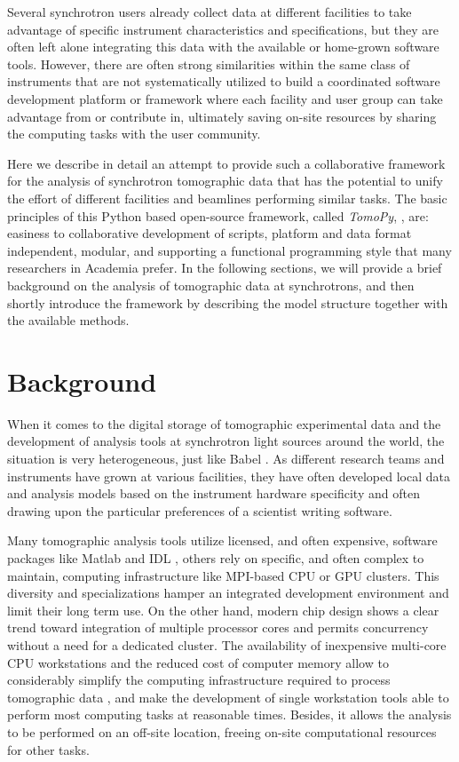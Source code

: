 \documentclass[pdf]{iucr}              %
\begin{document}
Several synchrotron users already collect data at different facilities to take advantage of specific instrument characteristics and specifications, but they are often left alone integrating this data with the available or home-grown software tools. However, there are often strong similarities within the same class of instruments that are not systematically utilized to build a coordinated software development platform or framework where each facility and user group can take advantage from or contribute in, ultimately saving on-site resources by sharing the computing tasks with the user community. 

Here we describe in detail an attempt to provide such a collaborative framework for the analysis of synchrotron tomographic data that has the potential to unify the effort of different facilities and beamlines performing similar tasks. The basic principles of this Python based open-source framework, called {\it TomoPy}, \cite{python_cpp}, are: easiness to collaborative development of scripts, platform and data format independent, modular,  and supporting a functional programming style that many researchers in Academia prefer. In the following sections, we will provide a brief background on the analysis of tomographic data at synchrotrons, and then shortly introduce the framework by describing the model structure together with the available methods. 


\section{Background}

When it comes to the digital storage of tomographic experimental data and the development of analysis tools at synchrotron light sources around the world, the situation is very heterogeneous, just like Babel \cite{genesis}. As different research teams and instruments have grown at various facilities, they have often developed local data and analysis models based on the instrument hardware specificity and often drawing upon the particular preferences of a scientist writing software. 

Many tomographic analysis tools utilize licensed, and often expensive, software packages like Matlab \cite{matlab} and IDL \cite{exelis_vis}, others rely on specific, and often complex to maintain, computing infrastructure like MPI-based CPU or GPU clusters. This diversity and specializations hamper an integrated development environment and limit their long term use. On the other hand, modern chip design shows a clear trend toward integration of multiple processor cores and permits concurrency without a need for a dedicated cluster. The availability of inexpensive multi-core CPU workstations and the reduced cost of computer memory allow to considerably simplify the computing infrastructure required to process tomographic data \cite{rivers_spie_2012}, and make the development of single workstation tools able to perform most computing tasks at reasonable times. Besides, it allows the analysis to be performed on an off-site location, freeing on-site computational resources for other tasks. 
\end{document}
